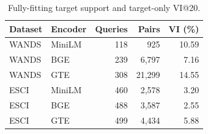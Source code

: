 \begin{table}[!t]
\centering
\caption{Fully-fitting target support and target-only VI@20.}
\label{tab:fitting_support}
\small
\begin{tabular}{llrrr}
\toprule
Dataset & Encoder & Queries & Pairs & VI (\%) \\
\midrule
WANDS & MiniLM & 118 & 925 & 10.59 \\
WANDS & BGE & 239 & 6,797 & 7.16 \\
WANDS & GTE & 308 & 21,299 & 14.55 \\
ESCI & MiniLM & 460 & 2,578 & 3.20 \\
ESCI & BGE & 488 & 3,587 & 2.55 \\
ESCI & GTE & 499 & 4,434 & 5.88 \\
\bottomrule
\end{tabular}
\end{table}
